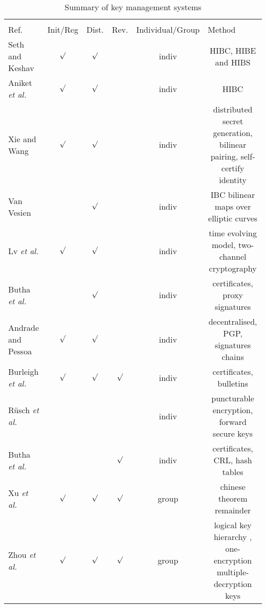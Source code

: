 \begin{landscape}
\begin{table}[hbt]
\begin{tabular}{lccccc}
 & \multicolumn{5}{l}{\cellcolor[HTML]{000000}{\color[HTML]{EFEFEF} Classification of key management systems}} \\
Ref. & \multicolumn{1}{l}{\cellcolor[HTML]{C0C0C0}Init/Reg} & \multicolumn{1}{l}{\cellcolor[HTML]{C0C0C0}Dist.} & \multicolumn{1}{l}{\cellcolor[HTML]{C0C0C0}Rev.} & \multicolumn{1}{l}{\cellcolor[HTML]{C0C0C0}Individual/Group} & \multicolumn{1}{l}{\cellcolor[HTML]{C0C0C0}\centering Method} \\
\cellcolor[HTML]{C0C0C0}Seth and Keshav\cite{seth2005practical}  & $\surd$ & $\surd$ &  & indiv & HIBC, HIBE and HIBS \\
\cellcolor[HTML]{C0C0C0}Aniket \textit{et al.}\cite{kate2007anonymity} & $\surd$ & $\surd$ &  & indiv & HIBC \\
\cellcolor[HTML]{C0C0C0}Xie and Wang\cite{xie2013practical} & $\surd$ & $\surd$ &  & indiv & distributed secret generation, bilinear pairing, self-certify identity \\
\cellcolor[HTML]{C0C0C0}Van Vesien \cite{van2010dynamic} & & $\surd$ &  & indiv & IBC bilinear maps over elliptic curves \\
\cellcolor[HTML]{C0C0C0}Lv \textit{et al.} \cite{lv2014non} & $\surd$ & $\surd$ &  & indiv &  time evolving model, two-channel cryptography \\
\cellcolor[HTML]{C0C0C0}Butha \textit{et al.} \cite{bhutta2014efficient} &  & $\surd$ &  & indiv & certificates, proxy signatures \\
\cellcolor[HTML]{C0C0C0}Andrade and Pessoa \cite{de2016fully}  & $\surd$ & $\surd$ &  & indiv & decentralised, PGP, signatures chains \\
\cellcolor[HTML]{C0C0C0}Burleigh \textit{et al.}\cite{burleigh-dtnwg-dtka-01} & $\surd$ & $\surd$ & $\surd$ & indiv & certificates, bulletins \\
\cellcolor[HTML]{C0C0C0}R\"{u}sch \textit{et al.}\cite{rusch2017forward} &  &  & & indiv & puncturable encryption, forward secure keys \\
\cellcolor[HTML]{C0C0C0}Butha \textit{et al.} \cite{bhutta2016public} &  &  & $\surd$ & indiv & certificates, CRL, hash tables \\
\cellcolor[HTML]{C0C0C0}Xu \textit{et al.} \cite{xu2012chinese} & $\surd$  & $\surd$ & $\surd$ & group & chinese theorem remainder \\
\cellcolor[HTML]{C0C0C0}Zhou \textit{et al.} \cite{zhou2014autonomic} & $\surd$ & $\surd$ & $\surd$ & group & logical key hierarchy , one-encryption multiple-decryption keys \\ \end{tabular}
\caption{Summary of key management systems}
\label{table:summary}
\end{table}

\end{landscape}


